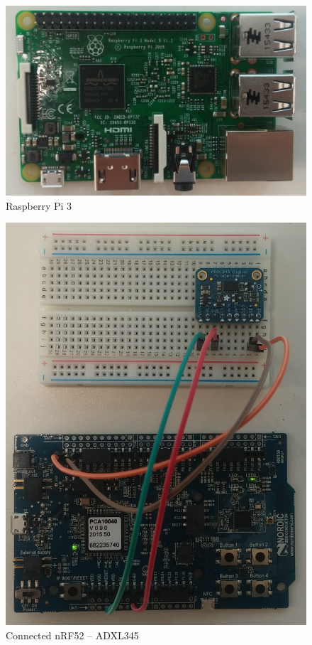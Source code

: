 \begin{figure}[h]
    \centering
    \includegraphics[scale=0.35]{pi3.png}    \caption{Raspberry Pi 3}
    \label{fig:adxl345}
\end{figure}

\begin{figure}[h]
    \centering
    \includegraphics[scale=0.35]{nrf-adxl.png}    \caption{Connected nRF52 -- ADXL345}
    \label{fig:adxl345}
\end{figure}


